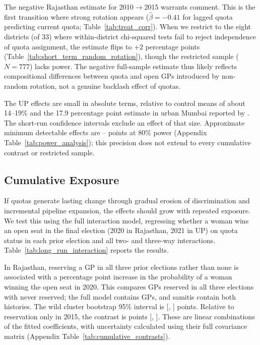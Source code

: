 \documentclass[12pt]{article}
\begin{document}
The negative Rajasthan estimate for 2010$\rightarrow$2015 warrants comment. This is the first transition where strong rotation appears ($\hat{\beta} = -0.41$ for lagged quota predicting current quota; Table~\ref{tab:treat_corr}). When we restrict to the eight districts (of 33) where within-district chi-squared tests fail to reject independence of quota assignment, the estimate flips to $+2$ percentage points (Table~\ref{tab:short_term_random_rotation}), though the restricted sample ($N = 777$) lacks power. The negative full-sample estimate thus likely reflects compositional differences between quota and open GPs introduced by non-random rotation, not a genuine backlash effect of quotas.

The UP effects are small in absolute terms, relative to control means of about 14--19\% and the 17.9 percentage point estimate in urban Mumbai reported by \citet{bhavnani2009electoral}. The short-run confidence intervals exclude an effect of that size. Approximate minimum detectable effects are \shortMdeMin{}--\shortMdeMax{} points at 80\% power (Appendix Table~\ref{tab:power_analysis}); this precision does not extend to every cumulative contrast or restricted sample.

\begin{table}[!htbp]
    \centering
    \caption{Short-run Effects}
    \label{tab:short_term_main}
    
\end{table}

\subsection{Cumulative Exposure}
 
If quotas generate lasting change through gradual erosion of discrimination and incremental pipeline expansion, the effects should grow with repeated exposure. We test this using the full interaction model, regressing whether a woman wins an open seat in the final election (2020 in Rajasthan, 2021 in UP) on quota status in each prior election and all two- and three-way interactions. Table~\ref{tab:long_run_interaction} reports the results.

In Rajasthan, reserving a GP in all three prior elections rather than none is associated with a \rajFullAlways{} percentage point increase in the probability of a woman winning the open seat in 2020. This compares \rajFullAlwaysLeftN{} GPs reserved in all three elections with \rajFullAlwaysRightN{} never reserved; the full model contains \rajFullAlwaysN{} GPs, and \rajFullAlwaysSharedClusters{} samitis contain both histories. The wild cluster bootstrap 95\% interval is [\rajFullAlwaysLow{}, \rajFullAlwaysHigh{}] points. Relative to reservation only in 2015, the contrast is \rajFullExtra{} points [\rajFullExtraLow{}, \rajFullExtraHigh{}]. These are linear combinations of the fitted coefficients, with uncertainty calculated using their full covariance matrix (Appendix Table~\ref{tab:cumulative_contrasts}).
\end{document}
